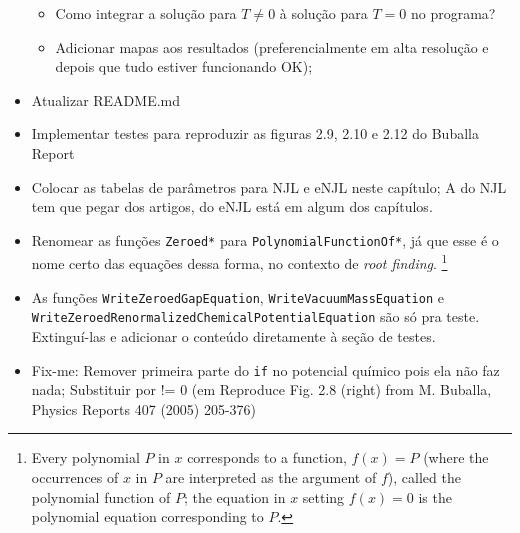 \begin{itemize}
\begin{itemize}
			\item Como integrar a solução para $T \neq 0$ à solução para $T = 0$ no programa?
			\item Adicionar mapas aos resultados (preferencialmente em alta resolução e depois que tudo estiver funcionando OK);
		\end{itemize}
	\item Atualizar README.md
	\item Implementar testes para reproduzir as figuras 2.9, 2.10 e 2.12 do Buballa Report
	\item Colocar as tabelas de parâmetros para NJL e eNJL neste capítulo; A do NJL tem que pegar dos artigos, do eNJL está em algum dos capítulos.
	\item Renomear as funções \texttt{Zeroed*} para \texttt{PolynomialFunctionOf*}, já que esse é o nome certo das equações dessa forma, no contexto de \emph{root finding}. \footnote{Every polynomial $P$ in $x$ corresponds to a function, $f(x) = P$ (where the occurrences of $x$ in $P$ are interpreted as the argument of $f$), called the polynomial function of $P$; the equation in $x$ setting $f(x) = 0$ is the polynomial equation corresponding to $P$.}
	\item As funções \texttt{WriteZeroedGapEquation}, \texttt{WriteVacuumMassEquation} e \texttt{WriteZeroedRenormalizedChemicalPotentialEquation} são só pra teste. Extinguí-las e adicionar o conteúdo diretamente à seção de testes.
	\item Fix-me: Remover primeira parte do \texttt{if} no potencial químico pois ela não faz nada; Substituir por != 0 (em Reproduce Fig. 2.8 (right) from  M. Buballa, Physics Reports 407 (2005) 205-376)
\end{itemize}

